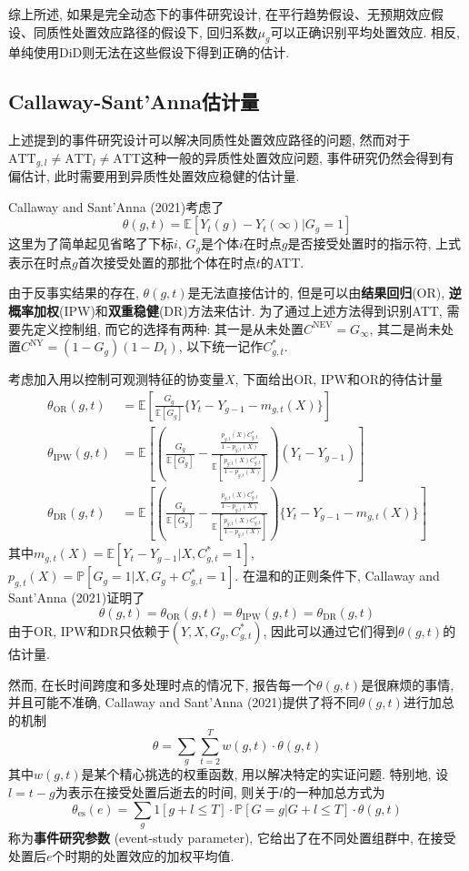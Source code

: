 \documentclass[cn,sakura,14pt,screen,bibstyle=gb7714-2015,math=mtpro2]{elegantnote}
\newcommand{\E}{\mathbb{E}}
\newcommand{\X}{X}
\begin{document}
综上所述, 如果是完全动态下的事件研究设计, 在平行趋势假设、无预期效应假设、同质性处置效应路径的假设下, 回归系数$\mu_g$可以正确识别平均处置效应. 相反, 单纯使用DiD则无法在这些假设下得到正确的估计.


\subsection{Callaway-Sant'Anna估计量}
上述提到的事件研究设计可以解决同质性处置效应路径的问题, 然而对于$\text{ATT}_{g,l}\neq\text{ATT}_l\ne\text{ATT}$这种一般的异质性处置效应问题, 事件研究仍然会得到有偏估计, 此时需要用到异质性处置效应稳健的估计量.

Callaway and Sant'Anna (2021)考虑了
$$\theta(g,t)=\E[Y_{t}(g)-Y_{t}(\infty)|G_g=1]$$
这里为了简单起见省略了下标$i$, $G_g$是个体$i$在时点$g$是否接受处置时的指示符, 上式表示在时点$g$首次接受处置的那批个体在时点$t$的ATT.

由于反事实结果的存在, $\theta(g,t)$是无法直接估计的, 但是可以由\textbf{结果回归}(OR), \textbf{逆概率加权}(IPW)和\textbf{双重稳健}(DR)方法来估计. 为了通过上述方法得到识别ATT, 需要先定义控制组, 而它的选择有两种: 其一是从未处置$C^\text{NEV}=G_\infty$, 其二是尚未处置$C^\text{NY}=(1-G_g)(1-D_t)$, 以下统一记作$C_{g,t}^\ast$.

考虑加入用以控制可观测特征的协变量$\X$, 下面给出OR, IPW和OR的待估计量
\begin{align*}
\theta_\text{OR}(g,t)&=\E\left[\frac{G_g}{\E[G_g]}\{Y_t-Y_{g-1}-m_{g,t}({X})\}\right] \\
\theta_\text{IPW}(g,t)&=\E\left[\left(\frac{G_g}{\E[G_g]}-\frac{\frac{p_{g,t}(\X)C_{g,t}^\ast}{1-p_{g,t}(\X)}}{\E\left[\frac{p_{g,t}(\X)C_{g,t}^\ast}{1-p_{g,t}(\X)}\right]}\right)(Y_t-Y_{g-1})\right] \\
\theta_{\text{DR}}(g,t)&=\E\left[\left(\frac{G_g}{\E[G_g]}-\frac{\frac{p_{g,t}(\X)C_{g,t}^\ast}{1-p_{g,t}(\X)}}{\E\left[\frac{p_{g,t}(\X)C_{g,t}^\ast}{1-p_{g,t}(\X)}\right]}\right)\{Y_t-Y_{g-1}-m_{g,t}(\X)\}\right]
\end{align*}
其中$m_{g,t}(X)=\E[Y_t-Y_{g-1}|X,C_{g,t}^\ast=1]$, $p_{g,t}(X)=\mathbb{P}[G_g=1|X,G_g+C_{g,t}^\ast=1]$. 在温和的正则条件下, Callaway and Sant'Anna (2021)证明了
$$\theta(g,t)=\theta_\text{OR}(g,t)=\theta_\text{IPW}(g,t)=\theta_\text{DR}(g,t)$$
由于OR, IPW和DR只依赖于$(Y,X,G_g,C_{g,t}^\ast)$, 因此可以通过它们得到$\theta(g,t)$的估计量.

然而, 在长时间跨度和多处理时点的情况下, 报告每一个$\theta(g,t)$是很麻烦的事情, 并且可能不准确, Callaway and Sant'Anna (2021)提供了将不同$\theta(g,t)$进行加总的机制
$$\theta=\sum_g\sum_{t=2}^Tw(g,t)\cdot\theta(g,t)$$
其中$w(g,t)$是某个精心挑选的权重函数, 用以解决特定的实证问题. 特别地, 设$l=t-g$为表示在接受处置后逝去的时间, 则关于$l$的一种加总方式为
$$\theta_{\text{es}}(e)=\sum_g1[g+l\leq T]\cdot\mathbb{P}[G=g|G+l\leq T]\cdot\theta(g,t)$$
称为\textbf{事件研究参数} (event-study parameter), 它给出了在不同处置组群中, 在接受处置后$e$个时期的处置效应的加权平均值.
\end{document}
